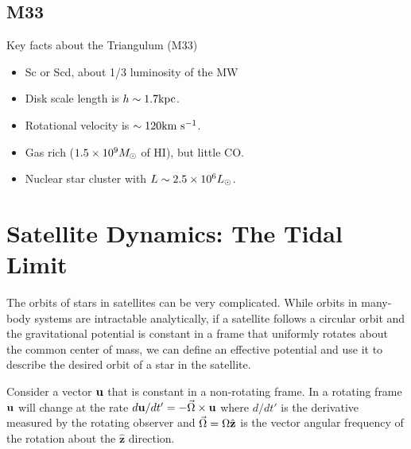 \documentclass[]{article}
\begin{document}
\subsection{M33}

Key facts about the Triangulum (M33)

\begin{itemize}
\item Sc or Scd, about 1/3 luminosity of the MW
\item Disk scale length is $h\sim1.7\mathrm{kpc}$.
\item Rotational velocity is $\sim120\mathrm{km}~\mathrm{s}^{-1}$.
\item Gas rich ($1.5\times10^9M_{\odot}$ of HI), but little CO.
\item Nuclear star cluster with $L\sim2.5\times10^6L_{\odot}$.
\end{itemize}

\section{Satellite Dynamics: The Tidal Limit}

The orbits of stars in satellites can be very complicated.
While orbits in many-body systems are intractable analytically,
if a satellite follows a circular orbit and the
gravitational potential is constant in a frame that
uniformly rotates about the common center of mass, we
can define an effective potential and use it to 
describe the desired orbit of a star in the satellite.

Consider a vector $\mathbf{u}$ that is constant in a 
non-rotating frame. In a rotating frame $\mathbf{u}$
will change at the rate $d\mathbf{u}/dt' = -\vec{\Omega} \times \mathbf{u}$
where $d/dt'$ is the derivative measured by
the rotating observer and $\vec{\Omega} = \Omega\hat{\mathbf{z}}$ is the
vector angular frequency of the rotation about the $\hat{\mathbf{z}}$
direction.
\end{document}
